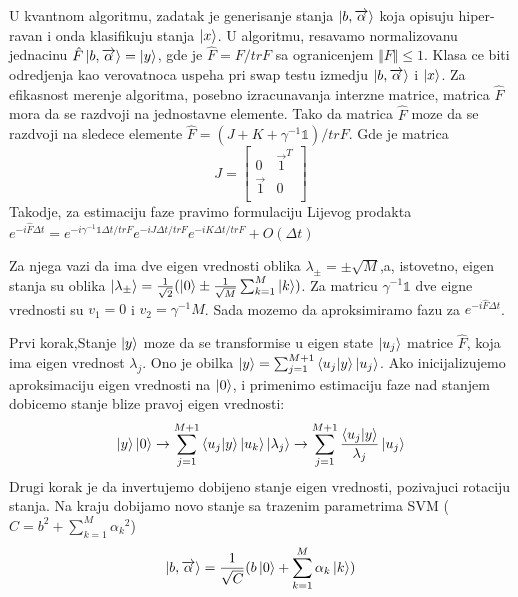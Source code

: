 \documentclass[12pt, letterpaper, oneside]{article}
\begin{document}
U kvantnom algoritmu, zadatak je generisanje stanja $\Ket{b,\overrightarrow{\alpha}}$ koja opisuju hiper-ravan i onda klasifikuju stanja
$\Ket{x}$. U algoritmu, resavamo normalizovanu jednacinu $\hat{F}\Ket{b,\overrightarrow{\alpha}} = \Ket{y}$, gde je $\hat{F} = F/trF$ sa 
ogranicenjem $\Vert F \Vert \leq 1$. Klasa ce biti odredjenja kao verovatnoca uspeha pri swap testu izmedju $\Ket{b,\overrightarrow{\alpha}}$ i
$\Ket{x}$. Za efikasnost merenje algoritma, posebno izracunavanja interzne matrice, matrica $\hat{F}$ mora da se razdvoji na jednostavne elemente.
Tako da matrica $\hat{F}$ moze da se razdvoji na sledece elemente $\hat{F} = (J+K+\gamma^{-1}\mathbb{1})/trF$. 
Gde je matrica
\[
    J = \begin{bmatrix}
        0 & \overrightarrow{1}^T \\
        \overrightarrow{1} & 0 \\
    \end{bmatrix}
\]
Takodje, za estimaciju faze pravimo formulaciju Lijevog prodakta \\
$e^{-i\hat{F}\varDelta{t}} = e^{-i\gamma^{-1}\mathbb{1}\varDelta{t}/trF}e^{-iJ\varDelta{t}/trF}e^{-iK\varDelta{t}/trF} + O(\varDelta{t})$

Za njega vazi da ima dve eigen vrednosti oblika $\lambda_{\pm} = \pm \sqrt{M}$,a, istovetno, 
eigen stanja su oblika $\Ket{\lambda_{\pm}} = \frac{1}{\sqrt{2}}(\Ket{0} \pm \frac{1}{\sqrt{M}}\sum_{k=1}^M\Ket{k})$.
Za matricu $\gamma^{-1}\mathbb{1}$ dve eigne vrednosti su $v_1 = 0$ i $v_2 = \gamma^{-1}M$.
Sada mozemo da aproksimiramo fazu za $e^{-i\hat{F}\varDelta{t}}$.

Prvi korak,Stanje $\Ket{y}$ moze da se transformise u eigen state $\Ket{u_j}$ matrice $\hat{F}$, koja ima eigen vrednost $\lambda_j$.
Ono je obilka $\Ket{y} = \sum_{j=1}^{M+1}\braket{u_j|y}\Ket{u_j}$. Ako inicijalizujemo aproksimaciju eigen vrednosti na $\Ket{0}$, i primenimo 
estimaciju faze nad stanjem dobicemo stanje blize pravoj eigen vrednosti:
\[
  \Ket{y}\Ket{0} \to \sum_{j=1}^{M+1}\braket{u_j|y}\Ket{u_k}\Ket{\lambda_j} \to \sum_{j=1}^{M+1}\frac{\braket{u_j|y}}{\lambda_j}\Ket{u_j}
\]
Drugi korak je da invertujemo dobijeno stanje eigen vrednosti, pozivajuci rotaciju stanja. Na kraju dobijamo novo stanje sa trazenim parametrima SVM ($C = b^2 + \sum_{k=1}^M{\alpha_k}^2$)
\[
    \Ket{b,\overrightarrow{\alpha}} = \frac{1}{\sqrt{C}}(b\Ket{0}+ \sum_{k=1}^M{\alpha_k \Ket{k}})
\]
\end{document}
